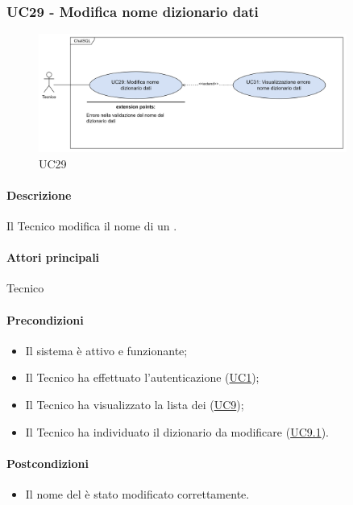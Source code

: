 \subsubsection{UC29 - Modifica nome dizionario dati}\label{UC29}

\begin{figure}[H]
  \centering
  \includegraphics[width=0.90\textwidth]{assets/uc29.png}
  \caption{UC29}
\end{figure}

\paragraph*{Descrizione}
Il Tecnico modifica il nome di un .

\paragraph*{Attori principali}
Tecnico

\paragraph*{Precondizioni}
\begin{itemize}
  \item Il sistema è attivo e funzionante;
  \item Il Tecnico ha effettuato l'autenticazione (\hyperref[UC1]{UC1});
  \item Il Tecnico ha visualizzato la lista dei  (\hyperref[UC9]{UC9});
  \item Il Tecnico ha individuato il dizionario da modificare (\hyperref[UC9.1]{UC9.1}).
\end{itemize}

\paragraph*{Postcondizioni}
\begin{itemize}
  \item Il nome del  è stato modificato correttamente.
\end{itemize}

